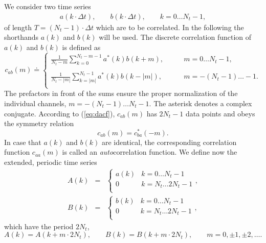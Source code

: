 \documentclass[a4paper,11pt]{report}
\begin{document}
\begin{appendices}
We consider two time series
\begin{eqnarray}
a(k\cdot\Delta t),\qquad b(k\cdot\Delta t), \qquad k = 0\ldots N_t-1, 
\end{eqnarray}
of length $T = (N_t-1)\cdot\Delta t$ which are to be correlated. In the
following the shorthands $a(k)$ and $b(k)$ will be used. The discrete
correlation function of $a(k)$ and $b(k)$ is defined as
\begin{equation}
\label{eq:dacf}
c_{ab}(m) \doteq \left\{
\begin{array}{ll}
\frac{1}{N_t - m}\sum_{k=0}^{N_t-m-1}a^*(k)b(k+m),
                 \qquad &m= 0\ldots N_t-1,\\
&\\
\frac{1}{N_t - |m|}\sum_{k=|m|}^{N_t-1}a^*(k)b(k-|m|),
                 \qquad &m= -(N_t-1)\ldots -1.\\
\end{array} \right.
\end{equation}
The prefactors in front of the sums ensure the proper normalization of
the individual channels, $m = -(N_t-1)\ldots N_t-1$.  The asterisk
denotes a complex conjugate. According to (\ref{eq:dacf}),
$c_{ab}(m)$ has $2N_t - 1$ data points and obeys the symmetry relation
\begin{equation}
c_{ab}(m) = c^*_{ba}(-m).
\end{equation}
In case that $a(k)$ and $b(k)$ are identical, the corresponding
correlation function $c_{aa}(m)$ is called an \textit{auto}correlation
function. We define now the extended, periodic time series
\begin{eqnarray}
\label{eq:a}
A(k) &= &\left\{\begin{array}{ll}
                a(k) &k = 0\ldots N_t-1\\
                0    &k = N_t \ldots 2N_t-1\\
                \end{array}\right.,\\
\label{eq:b}
B(k) &= &\left\{\begin{array}{ll}
                b(k) &k = 0\ldots N_t-1\\
                0    &k = N_t \ldots 2N_t-1\\
                \end{array}\right.,
\end{eqnarray}
which have the period $2N_t$,
\begin{equation}
A(k) = A(k + m\cdot 2N_t),\qquad
B(k) = B(k + m\cdot 2N_t),\qquad m = 0,\pm 1,\pm 2,\ldots.
\end{equation}

\end{appendices}
\end{document}
